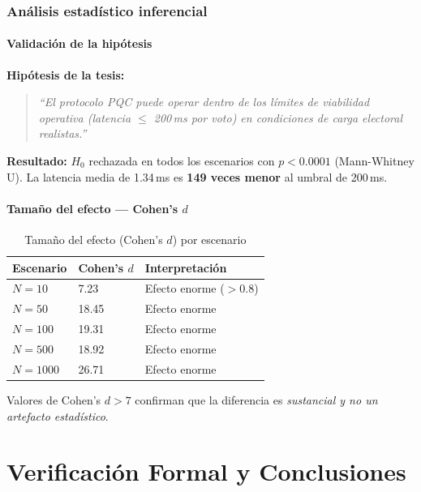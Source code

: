 \documentclass[12pt,a4paper,twoside,openright]{book}
\theoremstyle{plain}
\theoremstyle{definition}
\theoremstyle{remark}
\begin{document}
\section{An\'alisis estad\'istico inferencial}

\subsection{Validaci\'on de la hip\'otesis}

\textbf{Hip\'otesis de la tesis:}
\begin{quote}
  \textit{``El protocolo PQC puede operar dentro de los l\'imites de
  viabilidad operativa (latencia $\leq$ 200\,ms por voto) en condiciones
  de carga electoral realistas.''}
\end{quote}

\textbf{Resultado:} $H_0$ rechazada en todos los escenarios con
$p < 0.0001$ (Mann-Whitney U). La latencia media de 1.34\,ms es
\textbf{149 veces menor} al umbral de 200\,ms.

\subsection{Tama\~no del efecto --- Cohen's $d$}

\begin{table}[H]
\centering
\caption{Tama\~no del efecto (Cohen's $d$) por escenario}
\label{tab:cohen}
\begin{tabular}{lll}
\toprule
\textbf{Escenario} & \textbf{Cohen's $d$} & \textbf{Interpretaci\'on} \\
\midrule
$N=10$   & 7.23  & Efecto enorme ($>$0.8) \\
$N=50$   & 18.45 & Efecto enorme \\
$N=100$  & 19.31 & Efecto enorme \\
$N=500$  & 18.92 & Efecto enorme \\
$N=1000$ & 26.71 & Efecto enorme \\
\bottomrule
\end{tabular}
\end{table}

Valores de Cohen's $d > 7$ confirman que la diferencia es
\emph{sustancial y no un artefacto estad\'istico}.

\part{Verificaci\'on Formal y Conclusiones}
\end{document}
